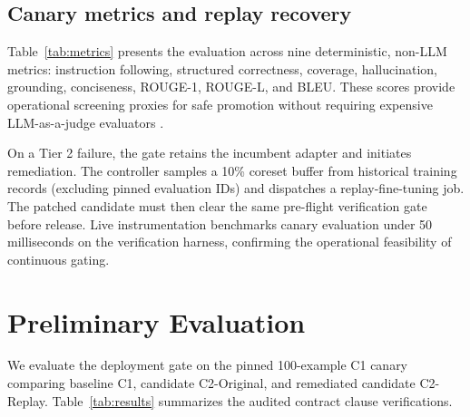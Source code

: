 \documentclass[conference]{IEEEtran}
\begin{document}
\subsection{Canary metrics and replay recovery}
Table~\ref{tab:metrics} presents the evaluation across nine deterministic, non-LLM metrics: instruction following, structured correctness, coverage, hallucination, grounding, conciseness, ROUGE-1, ROUGE-L, and BLEU. These scores provide operational screening proxies for safe promotion without requiring expensive LLM-as-a-judge evaluators \cite{https://doi.org/10.1111/nyas.15007,lin-etal-2022-truthfulqa,10.1145/3571730,hao2025how}.

On a Tier 2 failure, the gate retains the incumbent adapter and initiates remediation. The controller samples a 10\% coreset buffer from historical training records (excluding pinned evaluation IDs) and dispatches a replay-fine-tuning job. The patched candidate must then clear the same pre-flight verification gate before release. Live instrumentation benchmarks canary evaluation under 50 milliseconds on the verification harness, confirming the operational feasibility of continuous gating.

\section{Preliminary Evaluation}
We evaluate the deployment gate on the pinned 100-example C1 canary comparing baseline C1, candidate C2-Original, and remediated candidate C2-Replay. Table~\ref{tab:results} summarizes the audited contract clause verifications.
\end{document}
